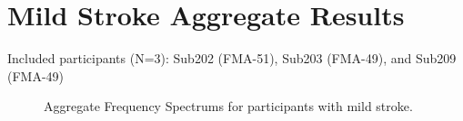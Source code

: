 \documentclass{article}
\begin{document}
\clearpage
\section{Mild Stroke Aggregate Results}

Included participants (N=3): Sub202 (FMA-51), Sub203 (FMA-49), and Sub209 (FMA-49)


\begin{figure}[!ht]
     \centering
     \hfill
     \hfill
	\caption{Aggregate Frequency Spectrums for participants with mild stroke.}
\end{figure}
\end{document}

